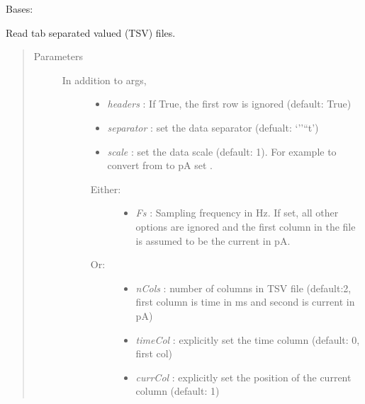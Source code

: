 \documentclass[letterpaper,10pt,english]{sphinxmanual}
\begin{document}
\begin{fulllineitems}
\label{api-doc/mosaic.traj:mosaic.tsvTrajIO.tsvTrajIO}
Bases: {\hyperref[api\string-doc/mosaic.meta:mosaic.metaTrajIO.metaTrajIO]{\emph{}}}

Read tab separated valued (TSV) files.
\begin{quote}\begin{description}
\item[{Parameters}] \leavevmode\begin{description}
\item[{In addition to {\hyperref[api\string-doc/mosaic.meta:mosaic.metaTrajIO.metaTrajIO]{\emph{}}} args,}] \leavevmode\begin{itemize}
\item {} 
\emph{headers} :           If True, the first row is ignored (default: True)

\item {} 
\emph{separator} : set the data separator (defualt: `''``t')

\item {} 
\emph{scale} : set the data scale (default: 1). For example to convert from  to pA set .

\end{itemize}
\begin{description}
\item[{Either:}] \leavevmode\begin{itemize}
\item {} 
\emph{Fs} :                        Sampling frequency in Hz. If set, all other options are ignored and the first column in the file is assumed to be the current in pA.

\end{itemize}

\item[{Or:}] \leavevmode\begin{itemize}
\item {} 
\emph{nCols} :             number of columns in TSV file (default:2, first column is time in ms and second is current in pA)

\item {} 
\emph{timeCol} :           explicitly set the time column (default: 0, first col)

\item {} 
\emph{currCol} :           explicitly set the position of the current column (default: 1)


\end{itemize}
\end{description}
\end{description}
\end{description}
\end{quote}
\end{fulllineitems}
\end{document}

